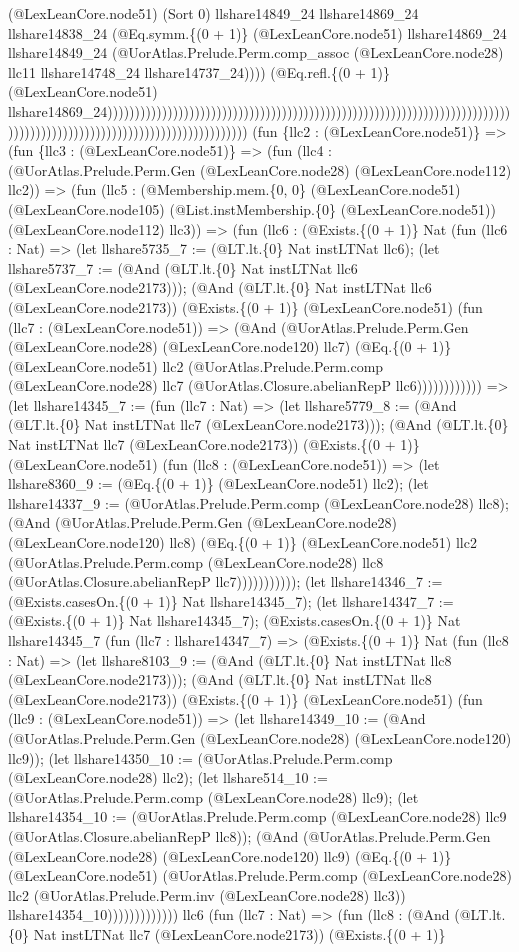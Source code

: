\documentclass[11pt]{article}
\begin{document}
(@LexLeanCore.node51) (Sort 0) llshare14849\_24 llshare14869\_24 llshare14838\_24 (@Eq.symm.\{(0 + 1)\} (@LexLeanCore.node51) llshare14869\_24 llshare14849\_24 (@UorAtlas.Prelude.Perm.comp\_assoc (@LexLeanCore.node28) llc11 llshare14748\_24 llshare14737\_24)))) (@Eq.refl.\{(0 + 1)\} (@LexLeanCore.node51) llshare14869\_24)))))))))))))))))))))))))))))))))))))))))))))))))))))))))))))))))))))))))))))))))))))))))))))))))))))))))))))))))))))) (fun \{llc2 : (@LexLeanCore.node51)\} => (fun \{llc3 : (@LexLeanCore.node51)\} => (fun (llc4 : (@UorAtlas.Prelude.Perm.Gen (@LexLeanCore.node28) (@LexLeanCore.node112) llc2)) => (fun (llc5 : (@Membership.mem.\{0, 0\} (@LexLeanCore.node51) (@LexLeanCore.node105) (@List.instMembership.\{0\} (@LexLeanCore.node51)) (@LexLeanCore.node112) llc3)) => (fun (llc6 : (@Exists.\{(0 + 1)\} Nat (fun (llc6 : Nat) => (let llshare5735\_7 := (@LT.lt.\{0\} Nat instLTNat llc6); (let llshare5737\_7 := (@And (@LT.lt.\{0\} Nat instLTNat llc6 (@LexLeanCore.node2173))); (@And (@LT.lt.\{0\} Nat instLTNat llc6 (@LexLeanCore.node2173)) (@Exists.\{(0 + 1)\} (@LexLeanCore.node51) (fun (llc7 : (@LexLeanCore.node51)) => (@And (@UorAtlas.Prelude.Perm.Gen (@LexLeanCore.node28) (@LexLeanCore.node120) llc7) (@Eq.\{(0 + 1)\} (@LexLeanCore.node51) llc2 (@UorAtlas.Prelude.Perm.comp (@LexLeanCore.node28) llc7 (@UorAtlas.Closure.abelianRepP llc6)))))))))))) => (let llshare14345\_7 := (fun (llc7 : Nat) => (let llshare5779\_8 := (@And (@LT.lt.\{0\} Nat instLTNat llc7 (@LexLeanCore.node2173))); (@And (@LT.lt.\{0\} Nat instLTNat llc7 (@LexLeanCore.node2173)) (@Exists.\{(0 + 1)\} (@LexLeanCore.node51) (fun (llc8 : (@LexLeanCore.node51)) => (let llshare8360\_9 := (@Eq.\{(0 + 1)\} (@LexLeanCore.node51) llc2); (let llshare14337\_9 := (@UorAtlas.Prelude.Perm.comp (@LexLeanCore.node28) llc8); (@And (@UorAtlas.Prelude.Perm.Gen (@LexLeanCore.node28) (@LexLeanCore.node120) llc8) (@Eq.\{(0 + 1)\} (@LexLeanCore.node51) llc2 (@UorAtlas.Prelude.Perm.comp (@LexLeanCore.node28) llc8 (@UorAtlas.Closure.abelianRepP llc7))))))))))); (let llshare14346\_7 := (@Exists.casesOn.\{(0 + 1)\} Nat llshare14345\_7); (let llshare14347\_7 := (@Exists.\{(0 + 1)\} Nat llshare14345\_7); (@Exists.casesOn.\{(0 + 1)\} Nat llshare14345\_7 (fun (llc7 : llshare14347\_7) => (@Exists.\{(0 + 1)\} Nat (fun (llc8 : Nat) => (let llshare8103\_9 := (@And (@LT.lt.\{0\} Nat instLTNat llc8 (@LexLeanCore.node2173))); (@And (@LT.lt.\{0\} Nat instLTNat llc8 (@LexLeanCore.node2173)) (@Exists.\{(0 + 1)\} (@LexLeanCore.node51) (fun (llc9 : (@LexLeanCore.node51)) => (let llshare14349\_10 := (@And (@UorAtlas.Prelude.Perm.Gen (@LexLeanCore.node28) (@LexLeanCore.node120) llc9)); (let llshare14350\_10 := (@UorAtlas.Prelude.Perm.comp (@LexLeanCore.node28) llc2); (let llshare514\_10 := (@UorAtlas.Prelude.Perm.comp (@LexLeanCore.node28) llc9); (let llshare14354\_10 := (@UorAtlas.Prelude.Perm.comp (@LexLeanCore.node28) llc9 (@UorAtlas.Closure.abelianRepP llc8)); (@And (@UorAtlas.Prelude.Perm.Gen (@LexLeanCore.node28) (@LexLeanCore.node120) llc9) (@Eq.\{(0 + 1)\} (@LexLeanCore.node51) (@UorAtlas.Prelude.Perm.comp (@LexLeanCore.node28) llc2 (@UorAtlas.Prelude.Perm.inv (@LexLeanCore.node28) llc3)) llshare14354\_10))))))))))))) llc6 (fun (llc7 : Nat) => (fun (llc8 : (@And (@LT.lt.\{0\} Nat instLTNat llc7 (@LexLeanCore.node2173)) (@Exists.\{(0 + 1)\} 
\end{document}
